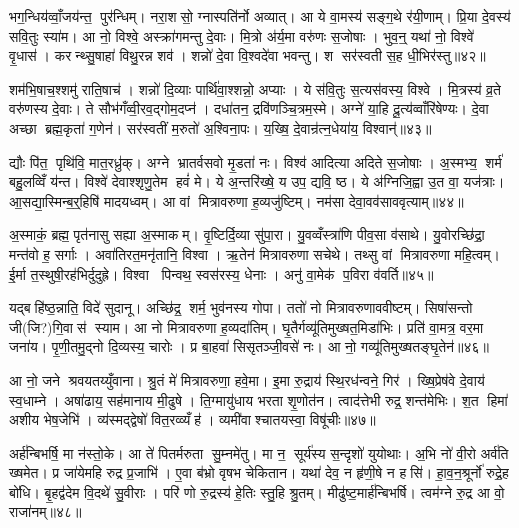 भग॒न्धिय॑व्वाँ॒जय॑न्त॒ पुर॑न्धिम्। नरा॒शसो॒ ग्नास्पति॑र्नो अव्यात्। आ ये वा॒मस्य॑ सङ्ग॒थे र॑यी॒णाम्। प्रि॒या दे॒वस्य॑ सवि॒तुः स्या॑म। आ नो॒ विश्वे॒ अस्क्रा॑गमन्तु दे॒वाः। मि॒त्रो अ॑र्य॒मा वरु॑णः स॒जोषाः। भुव॒न्॒ यथा॑ नो॒ विश्वे॑ वृ॒धास॑। करन्थ्सु॒षाहा॑ विथु॒रन्न शव॑। शन्नो॑ दे॒वा वि॒श्वदे॑वा भवन्तु। श सर॑स्वती स॒ह धी॒भिर॑स्तु॥४२॥

शम॑भि॒षाच॒श्शमु॑ राति॒षाच॑। शन्नो॑ दि॒व्याः पार्थि॑वा॒श्शन्नो॒ अप्याः। ये स॑वि॒तुः स॒त्यस॑वस्य॒ विश्वे। मि॒त्रस्य॑ व्र॒ते वरु॑णस्य दे॒वाः। ते सौभ॑गँव्वी॒रव॒द्गोम॒दप्न॑। दधा॑तन॒ द्रवि॑णञ्चि॒त्रम॒स्मे। अग्ने॑ या॒हि दू॒त्य॑व्वाँरि॑षेण्यः। दे॒वा अच्छा ब्रह्म॒कृता॑ ग॒णेन॑। सर॑स्वतीं म॒रुतो॑ अ॒श्विना॒पः। य॒ख्षि॒ दे॒वान्र॑त्न॒धेया॑य॒ विश्वान्॑॥४३॥

द्यौः पि॑त॒ पृथि॑वि॒ मात॒रध्रु॑क्। अग्ने भ्रातर्वसवो मृ॒डता॑ नः। विश्व॑ आदित्या अदिते स॒जोषाः। अ॒स्मभ्य॒ शर्म॑ बहु॒लव्विँ य॑न्त। विश्वे॑ देवाश्शृणु॒तेम हवं॑ मे। ये अ॒न्तरि॑ख्षे॒ य उप॒ द्यवि॒ ष्ठ। ये अ॑ग्निजि॒ह्वा उ॒त वा॒ यज॑त्राः। आ॒सद्या॒स्मिन्ब॒र्॒हिषि॑ मादयध्वम्। आ वां मित्रावरुणा ह॒व्यजु॑ष्टिम्। नम॑सा देवा॒वव॑साववृत्याम्॥४४॥

अ॒स्माकं॒ ब्रह्म॒ पृत॑नासु सह्या अ॒स्माकम्। वृ॒ष्टिर्दि॒व्या सु॑पा॒रा। यु॒वव्वँस्त्रा॑णि पीव॒सा व॑साथे। यु॒वोरच्छि॑द्रा॒ मन्त॑वो ह॒ सर्गाः। अवा॑तिरत॒मनृ॑तानि॒ विश्वा। ऋ॒तेन॑ मित्रावरुणा सचेथे। तथ्सु वां मित्रावरुणा महि॒त्वम्। ई॒र्मा त॒स्थुषी॒रह॑भिर्दुदुह्रे। विश्वा पिन्वथ॒ स्वस॑रस्य॒ धेनाः। अनु॑ वा॒मेक॑ प॒विरा व॑वर्ति॥४५॥

यद्बहि॑ष्ठ॒न्नाति॒ विदे॑ सुदानू। अच्छि॑द्र॒ शर्म॒ भुव॑नस्य गोपा। ततो॑ नो मित्रावरुणाववीष्टम्। सिषा॑सन्तो जी(जि?)गि॒वास॑ स्याम। आ नो मित्रावरुणा ह॒व्यदा॑तिम्। घृ॒तैर्गव्यू॑तिमुख्षत॒मिडा॑भिः। प्रति॑ वा॒मत्र॒ वर॒मा जना॑य। पृ॒णी॒तमु॒द्नो दि॒व्यस्य॒ चारोः। प्र बा॒हवा॑ सिसृतञ्जी॒वसे॑ नः। आ नो॒ गव्यू॑तिमुख्षतङ्घृ॒तेन॑॥४६॥

आ नो॒ जने श्रवयतय्युँवाना। श्रु॒तं मे॑ मित्रावरुणा॒ हवे॒मा। इ॒मा रु॒द्राय॑ स्थि॒रध॑न्वने॒ गिर॑। ख्षि॒प्रेष॑वे दे॒वाय॑ स्व॒धाम्ने। अषा॑ढाय॒ सह॑मानाय मी॒ढुषे। ति॒ग्मायु॑धाय भरता शृ॒णोत॑न। त्वाद॑त्तेभी रुद्र॒ शन्त॑मेभिः। श॒त हिमा॑ अशीय भेष॒जेभि॑। व्य॑स्मद्द्वेषो॑ वित॒रव्व्यँह॑। व्यमी॑वाश्चातयस्वा॒ विषू॑चीः॥४७॥

अर्\mbox{}ह॑न्बिभर्\mbox{}षि॒ मा न॑स्तो॒के। आ ते॑ पितर्मरुता सु॒म्नमे॑तु। मा न॒ सूर्य॑स्य स॒न्दृशो॑ युयोथाः। अ॒भि नो॑ वी॒रो अर्व॑ति ख्षमेत। प्र जा॑येमहि रुद्र प्र॒जाभि॑। ए॒वा ब॑भ्रो वृषभ चेकितान। यथा॑ देव॒ न हृ॑णी॒षे न हसि॑। हा॒व॒न॒श्रूर्नो॑ रुद्रे॒ह बो॑धि। बृ॒हद्व॑देम वि॒दथे॑ सु॒वीराः। परि॑ णो रु॒द्रस्य॑ हे॒तिः स्तु॒हि श्रु॒तम्। मीढु॑ष्ट॒मार्\mbox{}ह॑न्बिभर्\mbox{}षि। त्वम॑ग्ने रु॒द्र आ वो॒ राजा॑नम्॥४८॥\anuvakamend[वसू॑नि ततानास्तु॒ विश्वान्॑ ववृत्याव्वँवर्ति घृ॒तेन॒ विषू॑चीश्श्रु॒तन्द्वे च॑]

